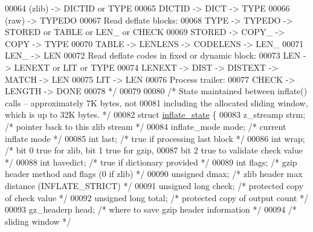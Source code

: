 \begin{DoxyCode}
00064 \textcolor{comment}{        (zlib) -> DICTID or TYPE}
00065 \textcolor{comment}{        DICTID -> DICT -> TYPE}
00066 \textcolor{comment}{        (raw) -> TYPEDO}
00067 \textcolor{comment}{    Read deflate blocks:}
00068 \textcolor{comment}{            TYPE -> TYPEDO -> STORED or TABLE or LEN\_ or CHECK}
00069 \textcolor{comment}{            STORED -> COPY\_ -> COPY -> TYPE}
00070 \textcolor{comment}{            TABLE -> LENLENS -> CODELENS -> LEN\_}
00071 \textcolor{comment}{            LEN\_ -> LEN}
00072 \textcolor{comment}{    Read deflate codes in fixed or dynamic block:}
00073 \textcolor{comment}{                LEN -> LENEXT or LIT or TYPE}
00074 \textcolor{comment}{                LENEXT -> DIST -> DISTEXT -> MATCH -> LEN}
00075 \textcolor{comment}{                LIT -> LEN}
00076 \textcolor{comment}{    Process trailer:}
00077 \textcolor{comment}{        CHECK -> LENGTH -> DONE}
00078 \textcolor{comment}{ */}
00079 
00080 \textcolor{comment}{/* State maintained between inflate() calls -- approximately 7K bytes, not}
00081 \textcolor{comment}{   including the allocated sliding window, which is up to 32K bytes. */}
00082 \textcolor{keyword}{struct }\hyperlink{structinflate__state}{inflate\_state} \{
00083     z\_streamp strm;             \textcolor{comment}{/* pointer back to this zlib stream */}
00084     inflate\_mode mode;          \textcolor{comment}{/* current inflate mode */}
00085     \textcolor{keywordtype}{int} last;                   \textcolor{comment}{/* true if processing last block */}
00086     \textcolor{keywordtype}{int} wrap;                   \textcolor{comment}{/* bit 0 true for zlib, bit 1 true for gzip,}
00087 \textcolor{comment}{                                   bit 2 true to validate check value */}
00088     \textcolor{keywordtype}{int} havedict;               \textcolor{comment}{/* true if dictionary provided */}
00089     \textcolor{keywordtype}{int} flags;                  \textcolor{comment}{/* gzip header method and flags (0 if zlib) */}
00090     \textcolor{keywordtype}{unsigned} dmax;              \textcolor{comment}{/* zlib header max distance (INFLATE\_STRICT) */}
00091     \textcolor{keywordtype}{unsigned} \textcolor{keywordtype}{long} check;        \textcolor{comment}{/* protected copy of check value */}
00092     \textcolor{keywordtype}{unsigned} \textcolor{keywordtype}{long} total;        \textcolor{comment}{/* protected copy of output count */}
00093     gz\_headerp head;            \textcolor{comment}{/* where to save gzip header information */}
00094         \textcolor{comment}{/* sliding window */}

\end{DoxyCode}
